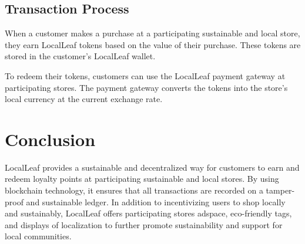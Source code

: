 \documentclass{article}
\begin{document}
\subsection{Transaction Process}

When a customer makes a purchase at a participating sustainable and local store, they earn LocalLeaf tokens based on the value of their purchase. These tokens are stored in the customer's LocalLeaf wallet.

To redeem their tokens, customers can use the LocalLeaf payment gateway at participating stores. The payment gateway converts the tokens into the store's local currency at the current exchange rate.

\section{Conclusion}

LocalLeaf provides a sustainable and decentralized way for customers to earn and redeem loyalty points at participating sustainable and local stores. By using blockchain technology, it ensures that all transactions are recorded on a tamper-proof and sustainable ledger. In addition to incentivizing users to shop locally and sustainably, LocalLeaf offers participating stores adspace, eco-friendly tags, and displays of localization to further promote sustainability and support for local communities.
\end{document}
